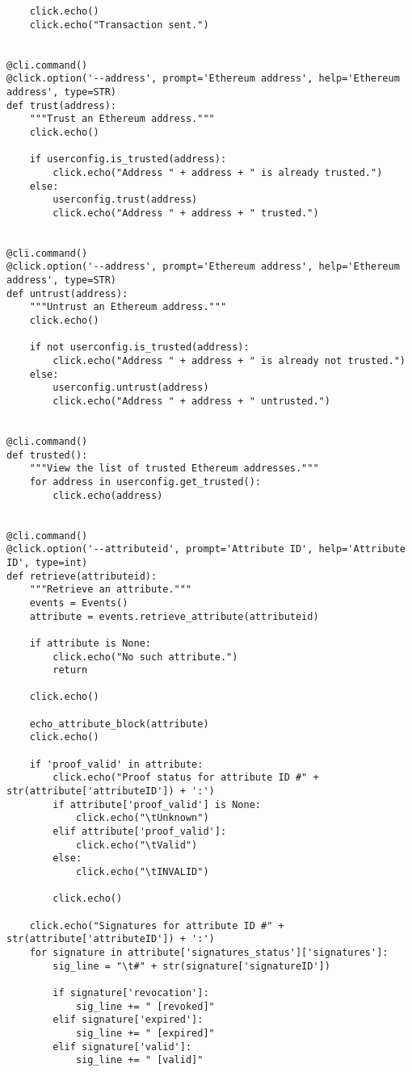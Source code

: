 \documentclass[12pt]{report}
\begin{document}
\begin{lstlisting}
    click.echo()
    click.echo("Transaction sent.")


@cli.command()
@click.option('--address', prompt='Ethereum address', help='Ethereum address', type=STR)
def trust(address):
    """Trust an Ethereum address."""
    click.echo()

    if userconfig.is_trusted(address):
        click.echo("Address " + address + " is already trusted.")
    else:
        userconfig.trust(address)
        click.echo("Address " + address + " trusted.")


@cli.command()
@click.option('--address', prompt='Ethereum address', help='Ethereum address', type=STR)
def untrust(address):
    """Untrust an Ethereum address."""
    click.echo()

    if not userconfig.is_trusted(address):
        click.echo("Address " + address + " is already not trusted.")
    else:
        userconfig.untrust(address)
        click.echo("Address " + address + " untrusted.")


@cli.command()
def trusted():
    """View the list of trusted Ethereum addresses."""
    for address in userconfig.get_trusted():
        click.echo(address)


@cli.command()
@click.option('--attributeid', prompt='Attribute ID', help='Attribute ID', type=int)
def retrieve(attributeid):
    """Retrieve an attribute."""
    events = Events()
    attribute = events.retrieve_attribute(attributeid)

    if attribute is None:
        click.echo("No such attribute.")
        return

    click.echo()

    echo_attribute_block(attribute)
    click.echo()

    if 'proof_valid' in attribute:
        click.echo("Proof status for attribute ID #" + str(attribute['attributeID']) + ':')
        if attribute['proof_valid'] is None:
            click.echo("\tUnknown")
        elif attribute['proof_valid']:
            click.echo("\tValid")
        else:
            click.echo("\tINVALID")

        click.echo()

    click.echo("Signatures for attribute ID #" + str(attribute['attributeID']) + ':')
    for signature in attribute['signatures_status']['signatures']:
        sig_line = "\t#" + str(signature['signatureID'])

        if signature['revocation']:
            sig_line += " [revoked]"
        elif signature['expired']:
            sig_line += " [expired]"
        elif signature['valid']:
            sig_line += " [valid]"


\end{lstlisting}
\end{document}
